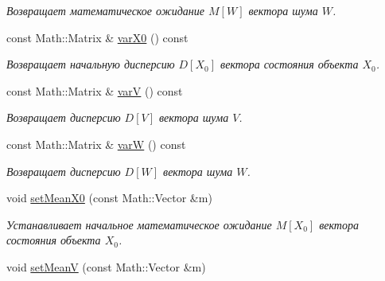 \begin{DoxyCompactItemize}
\begin{DoxyCompactList}\small\item\em Возвращает математическое ожидание $M[W]$ вектора шума $W$. \end{DoxyCompactList}\item 
const Math\+::\+Matrix \& \hyperlink{class_core_1_1_task_a84fbdd26fb43668d29fcf631e4bb9c99}{var\+X0} () const \hypertarget{class_core_1_1_task_a84fbdd26fb43668d29fcf631e4bb9c99}{}\label{class_core_1_1_task_a84fbdd26fb43668d29fcf631e4bb9c99}

\begin{DoxyCompactList}\small\item\em Возвращает начальную дисперсию $D[X_0]$ вектора состояния объекта $X_0$. \end{DoxyCompactList}\item 
const Math\+::\+Matrix \& \hyperlink{class_core_1_1_task_abff3522c513e054dbd0968a836e254fb}{varV} () const \hypertarget{class_core_1_1_task_abff3522c513e054dbd0968a836e254fb}{}\label{class_core_1_1_task_abff3522c513e054dbd0968a836e254fb}

\begin{DoxyCompactList}\small\item\em Возвращает дисперсию $D[V]$ вектора шума $V$. \end{DoxyCompactList}\item 
const Math\+::\+Matrix \& \hyperlink{class_core_1_1_task_aa217e300c05f5910cdd0a02a70956900}{varW} () const \hypertarget{class_core_1_1_task_aa217e300c05f5910cdd0a02a70956900}{}\label{class_core_1_1_task_aa217e300c05f5910cdd0a02a70956900}

\begin{DoxyCompactList}\small\item\em Возвращает дисперсию $D[W]$ вектора шума $W$. \end{DoxyCompactList}\item 
void \hyperlink{class_core_1_1_task_afdd5722479df7ff461d797b1b51ee9bf}{set\+Mean\+X0} (const Math\+::\+Vector \&m)\hypertarget{class_core_1_1_task_afdd5722479df7ff461d797b1b51ee9bf}{}\label{class_core_1_1_task_afdd5722479df7ff461d797b1b51ee9bf}

\begin{DoxyCompactList}\small\item\em Устанавливает начальное математическое ожидание $M[X_0]$ вектора состояния объекта $X_0$. \end{DoxyCompactList}\item 
void \hyperlink{class_core_1_1_task_abb608e7039dcf6058b1e6146ea51f87c}{set\+MeanV} (const Math\+::\+Vector \&m)\hypertarget{class_core_1_1_task_abb608e7039dcf6058b1e6146ea51f87c}{}\label{class_core_1_1_task_abb608e7039dcf6058b1e6146ea51f87c}


\end{DoxyCompactItemize}
